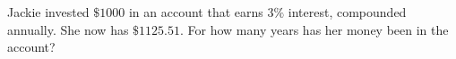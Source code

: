 Jackie invested $\$1000$ in an account that earns $3\%$ interest, compounded annually. She now has $\$1125.51$. For how many years has her money been in the account?
